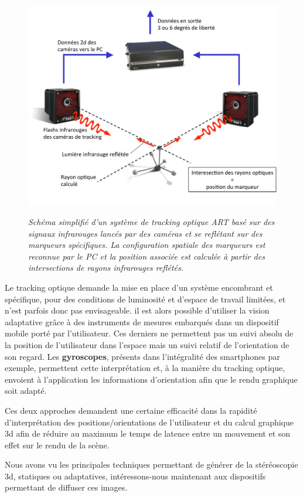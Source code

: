 \begin{figure}
  \centering
  {\includegraphics[width=.65\linewidth]{./figures/ch2/IR-tracking}}
    \caption[Schéma simplifié d'un système de tracking optique.]{{\it Schéma simplifié d'un système de tracking optique ART basé sur des signaux infrarouges lancés par des caméras et se reflétant sur des marqueurs spécifiques. La configuration spatiale des marqueurs est reconnue par le PC et la position associée est calculée à partir des intersections de rayons infrarouges reflétés.}}
  \label{Fig:ir-tracking}
  \hspace{0.3cm}
\end{figure}

Le tracking optique demande la mise en place d'un système encombrant et spécifique, pour des conditions de luminosité et d'espace de travail limitées, et n'est parfois donc pas envisageable. il est alors possible d'utiliser la vision adaptative grâce à des instruments de mesures embarqués dans un dispositif mobile porté par l'utilisateur. Ces derniers ne permettent pas un suivi absolu de la position de l'utilisateur dans l'espace mais un suivi relatif de l'orientation de son regard. Les \textbf{gyroscopes}, présents dans l'intégralité des smartphones par exemple, permettent cette interprétation et, à la manière du tracking optique, envoient à l'application les informations d'orientation afin que le rendu graphique soit adapté.

Ces deux approches demandent une certaine efficacité dans la rapidité d'interprétation des positions/orientations de l'utilisateur et du calcul graphique 3d afin de réduire au maximum le temps de latence entre un mouvement et son effet sur le rendu de la scène.

Nous avons vu les principales techniques permettant de générer de la stéréoscopie 3d, statiques ou adaptatives, intéressons-nous maintenant aux dispositifs permettant de diffuser ces images.

